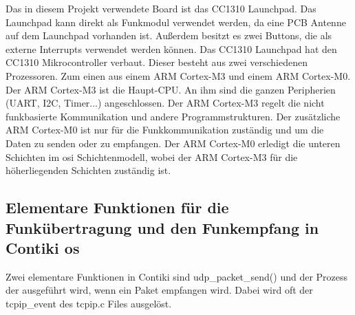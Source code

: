 	Das in diesem Projekt verwendete Board ist das CC1310 Launchpad. Das Launchpad kann direkt als Funkmodul verwendet werden, da eine PCB Antenne auf dem Launchpad vorhanden ist. Außerdem besitzt es zwei Buttons, die als externe Interrupts verwendet werden können. Das CC1310 Launchpad hat den CC1310 Mikrocontroller verbaut. Dieser besteht aus zwei verschiedenen Prozessoren. Zum einen aus einem ARM Cortex-M3 und einem ARM Cortex-M0. Der ARM Cortex-M3 ist die Haupt-CPU. An ihm sind die ganzen Peripherien (UART, I2C, Timer...) angeschlossen. Der ARM Cortex-M3 regelt die nicht funkbasierte Kommunikation und andere Programmstrukturen. Der zusätzliche ARM Cortex-M0 ist nur für die Funkkommunikation zuständig und um die Daten zu senden oder zu empfangen. Der ARM Cortex-M0 erledigt die unteren Schichten im \ac{osi} Schichtenmodell, wobei der ARM Cortex-M3 für die höherliegenden Schichten zuständig ist.
	\subsection{Elementare Funktionen für die Funkübertragung und den Funkempfang in Contiki \ac{os}}
	Zwei elementare Funktionen in Contiki sind udp\_packet\_send() und der Prozess der ausgeführt wird, wenn ein Paket empfangen wird. Dabei wird oft der tcpip\_event des tcpip.c Files ausgelöst.
	
